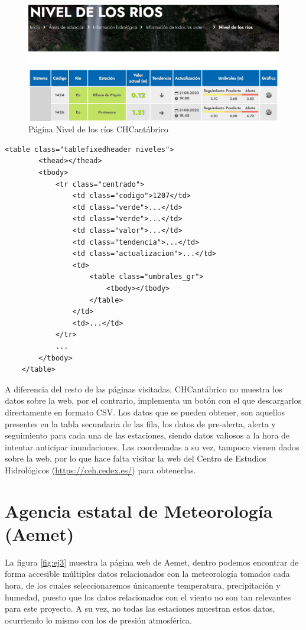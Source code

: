 \begin{figure} [H]
	\centering
	\includegraphics[width=.7\linewidth]{fig/CHCantabricoCode.png}
	\caption{Página Nivel de los ríos CHCantábrico}
	\label{fig:ej30}
\end{figure}

\begin{lstlisting}[basicstyle=\footnotesize, caption={HTML tabla estaciones en CHCantábrico}]
	<table class="tablefixedheader niveles">
		<thead></thead>
		<tbody>
			<tr class="centrado">
				<td class="codigo">1207</td>
				<td class="verde">...</td>
				<td class="verde">...</td>
				<td class="valor">...</td>
				<td class="tendencia">...</td>
				<td class="actualizacion">...</td>
				<td>
					<table class="umbrales_gr">											
						<tbody></tbody>
					</table>
				</td>
				<td>...</td>	
			</tr>
			...
		</tbody>
	</table>
\end{lstlisting}

A diferencia del resto de las páginas visitadas, CHCantábrico no muestra los datos sobre la web, por el contrario, implementa un botón con el que descargarlos directamente en formato CSV. Los datos que se pueden obtener, son aquellos presentes en la tabla secundaria de las fila, los datos de pre-alerta, alerta y seguimiento para cada una de las estaciones, siendo datos valiosos a la hora de intentar anticipar inundaciones. Las coordenadas a su vez, tampoco vienen dados sobre la web, por lo que hace falta visitar la web del Centro de Estudios Hidrológicos (\url{https://ceh.cedex.es/}) para obtenerlas.

\section{Agencia estatal de Meteorología (Aemet)}
La figura \ref{fig:ej3} muestra la página web de Aemet, dentro podemos encontrar de forma accesible múltiples datos relacionados con la meteorología tomados cada hora, de los cuales seleccionaremos únicamente temperatura, precipitación y humedad, puesto que los datos relacionados con el viento no son tan relevantes para este proyecto. A su vez, no todas las estaciones muestran estos datos, ocurriendo lo mismo con los de presión atmosférica.

